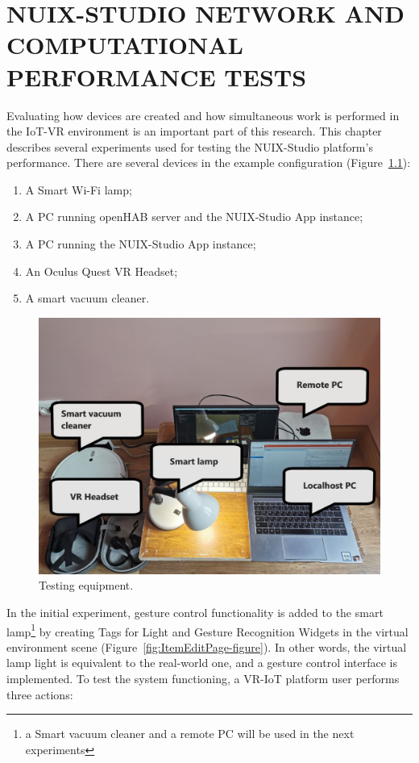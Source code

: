 
\chapter{\MakeUppercase{NUIX-Studio network and computational performance tests}}

Evaluating how devices are created and how simultaneous work is performed in the IoT-VR environment is an important part of this research. This chapter describes several experiments used for testing the NUIX-Studio platform's performance.
There are several devices in the example configuration (Figure~\ref{fig:TestingEquipment-figure}):
\begin{enumerate}
    \item A Smart Wi-Fi lamp;
    \item A PC running openHAB server and the NUIX-Studio App instance;
    \item A PC running the NUIX-Studio App instance;
    \item An Oculus Quest VR Headset;
    \item A smart vacuum cleaner.
\end{enumerate}

\begin{figure}
  \centering
  \includegraphics[width = 0.9 \linewidth]{figures/TestingEquipment.png}
  \caption{Testing equipment.}
  \label{fig:TestingEquipment-figure}
\end{figure}

In the initial experiment, gesture control functionality is added to the smart lamp\footnote{a Smart vacuum cleaner and a remote PC will be used in the next experiments} by creating Tags for Light and Gesture Recognition Widgets in the virtual environment scene (Figure~\ref{fig:ItemEditPage-figure}). In other words, the virtual lamp light is equivalent to the real-world one, and a gesture control interface is implemented. To test the system functioning, a VR-IoT platform user performs three actions:

